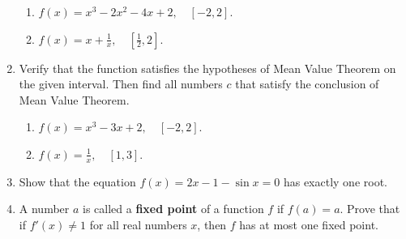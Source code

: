 \documentclass[letterpaper,11pt]{article}
\begin{document}
\begin{enumerate}
    \begin{enumerate}
        \item $f(x) = x^3 - 2x^2 -4x +2, \quad [-2,2]$.
        \vfill
        \item $f(x) = x + \frac{1}{x}, \quad [\frac{1}{2}, 2]$.
        \vfill
    \end{enumerate}
    \item Verify that the function satisfies the hypotheses of Mean Value Theorem on the given interval. Then find all numbers $c$ that satisfy the conclusion of Mean Value Theorem.
    \begin{enumerate}
        \item $f(x) = x^3 - 3x + 2, \quad [-2,2]$.
        \vfill
        \item $f(x) = \frac{1}{x}, \quad [1,3]$.
        \vfill 
    \end{enumerate}
    \newpage
    \item Show that the equation $f(x) = 2x - 1 - \sin{x} = 0$ has exactly one root.
    \vfill
    \item A number $a$ is called a \textbf{fixed point} of a function $f$ if $f(a) = a$. Prove that if $f'(x) \neq 1$ for all real numbers $x$, then $f$ has at most one fixed point.
    \vfill
\end{enumerate}
\end{document}
